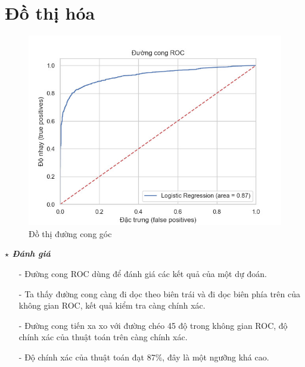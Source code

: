 \documentclass{report}
\newcommand\tab[1][1.25cm]{\hspace*{#1}}
\begin{document}
    \fontsize{16}{10}\selectfont
    \section{Đồ thị hóa}
        \begin{figure}[htp]
            \begin{center}
                \tab[1cm]\includegraphics[scale = 0.85]{image/roc.png}
                \caption{Đồ thị đường cong góc}
            \end{center}
        \end{figure}
    
        \fontsize{13}{10}\selectfont \textbf{$\star$\textit{ Đánh giá}}
            \begin{enumerate}
                \item [- ] Đường cong ROC dùng để đánh giá các kết quả của một dự đoán.
                \item [- ] Ta thấy đường cong càng đi dọc theo biên trái và đi dọc biên phía trên của không gian ROC, kết quả kiểm tra càng chính xác.
                \item [- ] Đường cong tiến xa xo với đường chéo 45 độ trong không gian ROC, độ chính xác của thuật toán trên càng chính xác.
                \item [- ] Độ chính xác của thuật toán đạt 87\%, đây là một ngưỡng khá cao.
            \end{enumerate}
            
\fontsize{18}{10}\selectfont
\end{document}
